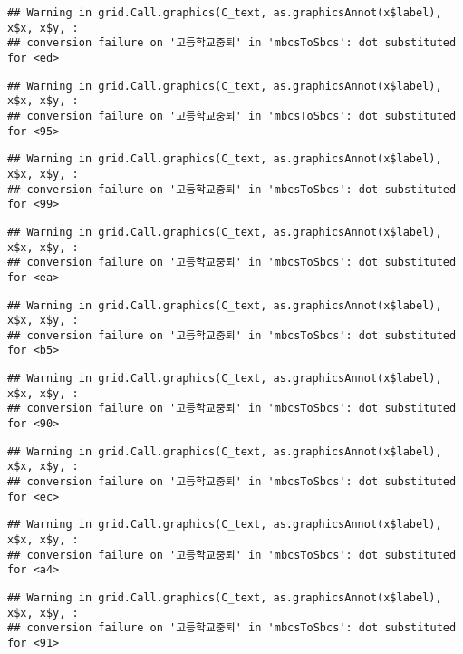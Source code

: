 \documentclass[
]{article}
\begin{document}
\begin{verbatim}
## Warning in grid.Call.graphics(C_text, as.graphicsAnnot(x$label), x$x, x$y, :
## conversion failure on '고등학교중퇴' in 'mbcsToSbcs': dot substituted for <ed>
\end{verbatim}

\begin{verbatim}
## Warning in grid.Call.graphics(C_text, as.graphicsAnnot(x$label), x$x, x$y, :
## conversion failure on '고등학교중퇴' in 'mbcsToSbcs': dot substituted for <95>
\end{verbatim}

\begin{verbatim}
## Warning in grid.Call.graphics(C_text, as.graphicsAnnot(x$label), x$x, x$y, :
## conversion failure on '고등학교중퇴' in 'mbcsToSbcs': dot substituted for <99>
\end{verbatim}

\begin{verbatim}
## Warning in grid.Call.graphics(C_text, as.graphicsAnnot(x$label), x$x, x$y, :
## conversion failure on '고등학교중퇴' in 'mbcsToSbcs': dot substituted for <ea>
\end{verbatim}

\begin{verbatim}
## Warning in grid.Call.graphics(C_text, as.graphicsAnnot(x$label), x$x, x$y, :
## conversion failure on '고등학교중퇴' in 'mbcsToSbcs': dot substituted for <b5>
\end{verbatim}

\begin{verbatim}
## Warning in grid.Call.graphics(C_text, as.graphicsAnnot(x$label), x$x, x$y, :
## conversion failure on '고등학교중퇴' in 'mbcsToSbcs': dot substituted for <90>
\end{verbatim}

\begin{verbatim}
## Warning in grid.Call.graphics(C_text, as.graphicsAnnot(x$label), x$x, x$y, :
## conversion failure on '고등학교중퇴' in 'mbcsToSbcs': dot substituted for <ec>
\end{verbatim}

\begin{verbatim}
## Warning in grid.Call.graphics(C_text, as.graphicsAnnot(x$label), x$x, x$y, :
## conversion failure on '고등학교중퇴' in 'mbcsToSbcs': dot substituted for <a4>
\end{verbatim}

\begin{verbatim}
## Warning in grid.Call.graphics(C_text, as.graphicsAnnot(x$label), x$x, x$y, :
## conversion failure on '고등학교중퇴' in 'mbcsToSbcs': dot substituted for <91>
\end{verbatim}
\end{document}
